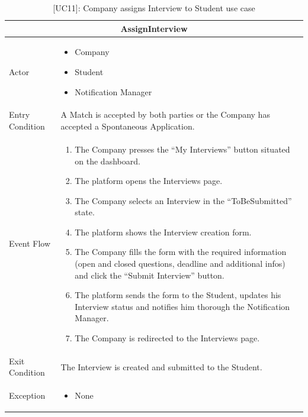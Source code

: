 \begin{table}[H]
    \centering
    \begin{tabular}{|p{3cm}|p{12cm}|}
    \hline
    \multicolumn{2}{|c|}{\textbf{AssignInterview}} \\ \hline
    Actor & 
    \begin{itemize}
        \item Company
        \item Student
        \item Notification Manager
    \end{itemize} \\ \hline
    Entry Condition & A Match is accepted by both parties or the Company has accepted a Spontaneous Application. \\ \hline
    Event Flow &      
    \begin{enumerate}         
        \item The Company presses the “My Interviews” button situated on the dashboard.
        \item The platform opens the Interviews page.
        \item The Company selects an Interview in the “ToBeSubmitted” state.
        \item The platform shows the Interview creation form.
        \item The Company fills the form with the required information (open and closed questions, deadline and additional infos) and click the “Submit Interview” button.
        \item The platform sends the form to the Student, updates his Interview status and notifies him thorough the Notification Manager.
        \item The Company is redirected to the Interviews page.
    \end{enumerate} \\ \hline
    Exit Condition & The Interview is created and submitted to the Student. \\ \hline
    Exception & 
    \begin{itemize}         
        \item None
    \end{itemize} \\ \hline
    \end{tabular}
    \caption{[UC11]: Company assigns Interview to Student use case}
    \label{tab:UC11}
\end{table}

